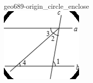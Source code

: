 \documentclass[12pt]{article}
\begin{document}
\begin{center}
\begin{minipage}{0.32\textwidth}
\end{minipage}
\hfill\begin{minipage}{0.32\textwidth}\centering
geo689-origin\_circle\_enclose\\
\includegraphics[width=0.95\linewidth]{out_rommath_origin/items/geo689-origin/assets/figure_circle.png}
\end{minipage}
\par
\end{center}
\bigskip
\end{document}
